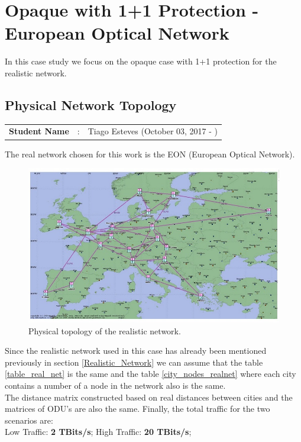 \clearpage

\section{Opaque with 1+1 Protection - European Optical Network}

In this case study we focus on the opaque case with 1+1 protection for the realistic network.

\subsection{Physical Network Topology}
\begin{tcolorbox}	
\begin{tabular}{p{2.75cm} p{0.2cm} p{10.5cm}} 	
\textbf{Student Name}  &:& Tiago Esteves    (October 03, 2017 - )\\
\end{tabular}
\end{tcolorbox}

The real network chosen for this work is the EON (European Optical Network).

\begin{figure}[h!]
\centering
\includegraphics[width=\textwidth]{sdf/opaque/figures/EON_Rede_Realista}
\caption{Physical topology of the realistic network.}
\end{figure}

Since the realistic network used in this case has already been mentioned previously in section \ref{Realistic_Network} we can assume that the table \ref{table_real_net} is the same and the table \ref{city_nodes_realnet} where each city contains a number of a node in the network also is the same.\\
The distance matrix constructed based on real distances between cities and the matrices of ODU's are also the same.
Finally, the total traffic for the two scenarios are:\\
Low Traffic: \textbf{2 TBits/s}; \quad High Traffic: \textbf{20 TBits/s};\\

